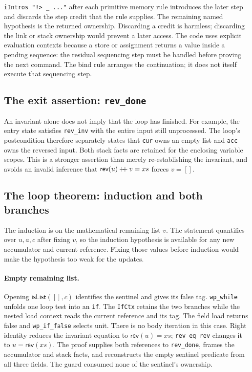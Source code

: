 \documentclass[11pt]{article}
\begin{document}
\texttt{iIntros "!> \_ ..."} after each primitive memory rule introduces the
later step and discards the step credit that the rule supplies. The remaining
named hypothesis is the returned ownership. Discarding a credit is harmless;
discarding the link or stack ownership would prevent a later access.
The code uses explicit evaluation contexts because a store or assignment
returns a value inside a pending sequence: the residual sequencing step must
be handled before proving the next command. The bind rule arranges the
continuation; it does not itself execute that sequencing step.

\subsection{The exit assertion: \texttt{rev\_done}}

\begin{minipage}{\linewidth}

\end{minipage}

An invariant alone does not imply that the loop has finished. For example, the
entry state satisfies \texttt{rev\_inv} with the entire input still unprocessed.
The loop's postcondition therefore separately states that \texttt{cur} owns an
empty list and \texttt{acc} owns the reversed input. Both stack facts are
retained for the enclosing variable scopes. This is a stronger assertion than
merely re-establishing the invariant, and avoids an invalid inference that
\(\mathsf{rev}(u)\mathbin{+\mkern-6mu+}v=xs\) forces \(v=[]\).

\subsection{The loop theorem: induction and both branches}



The induction is on the mathematical remaining list \(v\). The statement
quantifies over \(u,a,c\) after fixing \(v\), so the induction hypothesis is
available for any new accumulator and current reference. Fixing those values
before induction would make the hypothesis too weak for the updates.

\paragraph{Empty remaining list.}
Opening \(\mathsf{isList}([],c)\) identifies the sentinel and gives its false
tag. \texttt{wp\_while} unfolds one loop test into an \texttt{if}.
The \texttt{IfCtx} retains the two branches while the nested load context
reads the current reference and its tag. The field load returns false and
\texttt{wp\_if\_false} selects unit. There is no body iteration in this case.
Right identity reduces the invariant equation to \(\mathsf{rev}(u)=xs\);
\texttt{rev\_eq\_rev} changes it to \(u=\mathsf{rev}(xs)\).
The proof supplies both references to \texttt{rev\_done}, frames the accumulator
and stack facts, and reconstructs the empty sentinel predicate from all three
fields. The guard consumed none of the sentinel's ownership.
\end{document}
